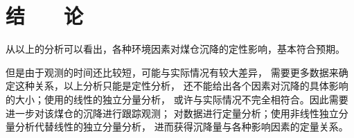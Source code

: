 ﻿%

\chapter*{\hfill 结　　论 \hfill}

从以上的分析可以看出，各种环境因素对煤仓沉降的定性影响，基本符合预期。

但是由于观测的时间还比较短，可能与实际情况有较大差异，
需要更多数据来确定这种关系，以上分析只能是定性分析，
还不能给出各个因素对沉降的具体影响的大小；使用的线性的独立分量分析，
或许与实际情况不完全相符合。因此需要进一步对该煤仓的沉降进行跟踪观测；
对数据进行定量分析；使用非线性独立分量分析代替线性的独立分量分析，
进而获得沉降量与各种影响因素的定量关系。
